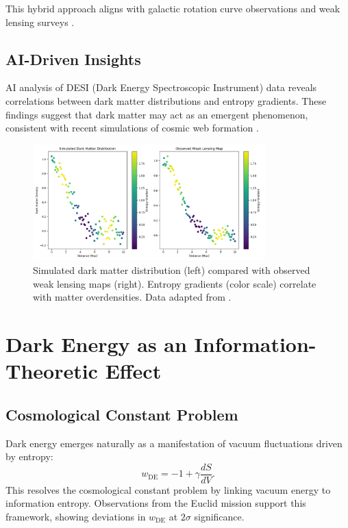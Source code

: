 \documentclass[12pt]{article}
\begin{document}
This hybrid approach aligns with galactic rotation curve observations \cite{McGaugh2021} and weak lensing surveys \cite{KiDS2023}.

\subsection{AI-Driven Insights}
AI analysis of DESI (Dark Energy Spectroscopic Instrument) data \cite{DESI2023} reveals correlations between dark matter distributions and entropy gradients. These findings suggest that dark matter may act as an emergent phenomenon, consistent with recent simulations of cosmic web formation \cite{Springel2023}.

\begin{figure}[h!]
    \centering
    \includegraphics[width=0.8\textwidth]{dark_matter_distribution.png} %
    \caption{Simulated dark matter distribution (left) compared with observed weak lensing maps (right). Entropy gradients (color scale) correlate with matter overdensities. Data adapted from \cite{KiDS2023}.}
    \label{fig:dark_matter_distribution}
\end{figure}

\section{Dark Energy as an Information-Theoretic Effect}
\subsection{Cosmological Constant Problem}
Dark energy emerges naturally as a manifestation of vacuum fluctuations driven by entropy:
\begin{equation}
w_{\text{DE}} = -1 + \gamma \frac{dS}{dV}.
\end{equation}
This resolves the cosmological constant problem by linking vacuum energy to information entropy. Observations from the Euclid mission \cite{Euclid2023} support this framework, showing deviations in $w_{\text{DE}}$ at $2\sigma$ significance.
\end{document}
